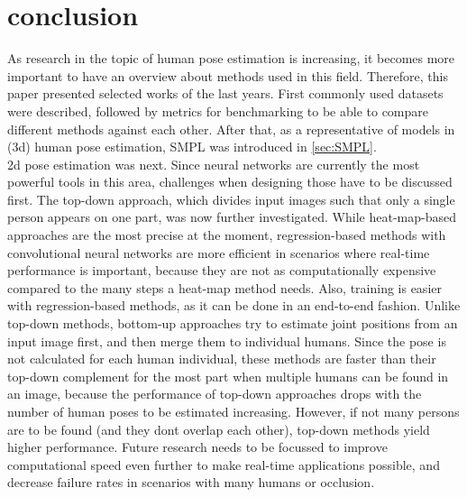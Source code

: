 \section{conclusion}
As research in the topic of human pose estimation is increasing, it becomes more important to have an overview about methods used in this field. Therefore, this paper presented selected works of the last years. First commonly used datasets were described, followed by metrics for benchmarking to be able to compare different methods against each other. After that, as a representative of models in (3d) human pose estimation, SMPL was introduced in \autoref{sec:SMPL}. 
\\2d pose estimation was next. Since neural networks are currently the most powerful tools in this area, challenges when designing those have to be discussed first. The top-down approach, which divides input images such that only a single person appears on one part, was now further investigated. While heat-map-based approaches are the most precise at the moment, regression-based methods with convolutional neural networks are more efficient in scenarios where real-time performance is important, because they are not as computationally expensive compared to the many steps a heat-map method needs. Also, training is easier with regression-based methods, as it can be done in an end-to-end fashion. Unlike top-down methods, bottom-up approaches try to estimate joint positions from an input image first, and then merge them to individual humans. Since the pose is not calculated for each human individual, these methods are faster than their top-down complement for the most part when multiple humans can be found in an image, because the performance of top-down approaches drops with the number of human poses to be estimated increasing. However, if not many persons are to be found (and they dont overlap each other), top-down methods yield higher performance. Future research needs to be focussed to improve computational speed even further to make real-time applications possible, and decrease failure rates in scenarios with many humans or occlusion.
